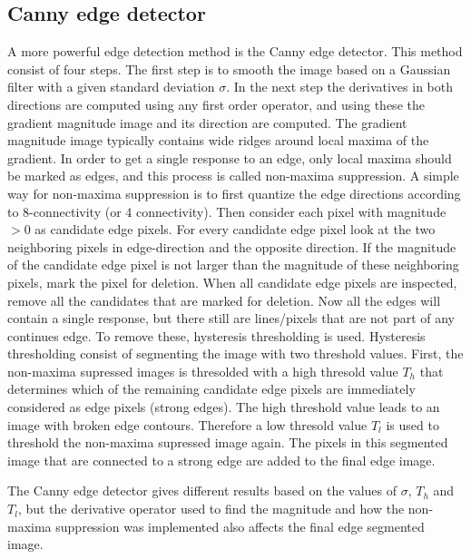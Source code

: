 \subsection{Canny edge detector}
A more powerful edge detection method is the Canny edge detector. This method consist of four steps. The first step is to smooth the image based on a Gaussian filter with a given standard deviation \(\sigma\). In the next step the derivatives in both directions are computed using any first order operator, and using these the gradient magnitude image and its direction are computed. The gradient magnitude image typically contains wide ridges around local maxima of the gradient. In order to get a single response to an edge, only local maxima should be marked as edges, and this process is called non-maxima suppression. A simple way for non-maxima suppression is to first quantize the edge directions according to 8-connectivity (or 4 connectivity). Then consider each pixel with magnitude \(> 0\) as candidate edge pixels. For every candidate edge pixel look at the two neighboring pixels in edge-direction and the opposite direction. If the magnitude of the candidate edge pixel is not larger than the magnitude of these neighboring pixels, mark the pixel for deletion. When all candidate edge pixels are inspected, remove all the candidates that are marked for deletion. Now all the edges will contain a single response, but there still are lines/pixels that are not part of any continues edge. To remove these, hysteresis thresholding is used. Hysteresis thresholding consist of segmenting the image with two threshold values. First, the non-maxima supressed images is thresolded with a high thresold value \(T_h\) that determines which of the remaining candidate edge pixels are immediately considered as edge pixels (strong edges). The high threshold value leads to an image with broken edge contours. Therefore a low thresold value \(T_l\) is used to threshold the non-maxima supressed image again. The pixels in this segmented image that are connected to a strong edge are added to the final edge image.

The Canny edge detector gives different results based on the values of \(\sigma\), \(T_h\) and \(T_l\), but the derivative operator used to find the magnitude and how the non-maxima suppression was implemented also affects the final edge segmented image.
